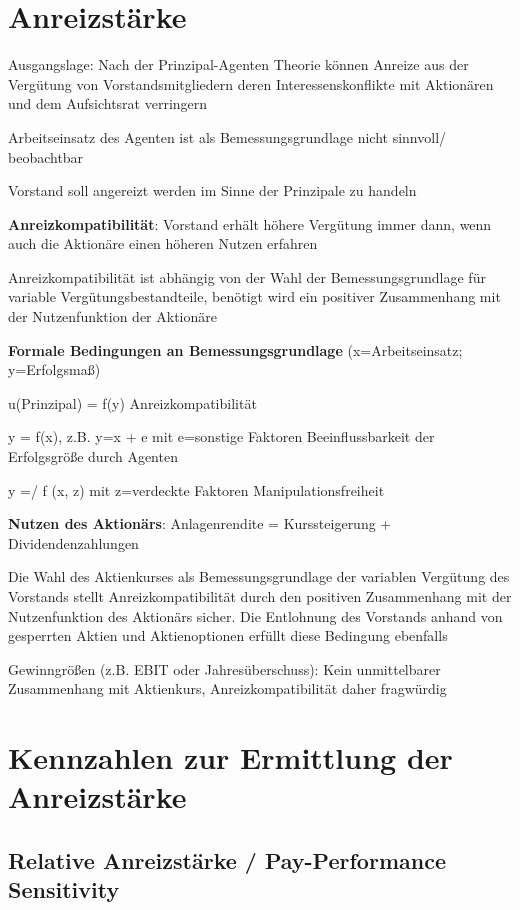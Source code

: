 \documentclass[
]{article}
\begin{document}
\hypertarget{anreizstuxe4rke}{%
\section{Anreizstärke}\label{anreizstuxe4rke}}

Ausgangslage: Nach der Prinzipal-Agenten Theorie können Anreize aus der
Vergütung von Vorstandsmitgliedern deren Interessenskonflikte mit
Aktionären und dem Aufsichtsrat verringern

Arbeitseinsatz des Agenten ist als Bemessungsgrundlage nicht sinnvoll/
beobachtbar

Vorstand soll angereizt werden im Sinne der Prinzipale zu handeln

\textbf{Anreizkompatibilität}: Vorstand erhält höhere Vergütung immer
dann, wenn auch die Aktionäre einen höheren Nutzen erfahren

Anreizkompatibilität ist abhängig von der Wahl der Bemessungsgrundlage
für variable Vergütungsbestandteile, benötigt wird ein positiver
Zusammenhang mit der Nutzenfunktion der Aktionäre

\textbf{Formale Bedingungen an Bemessungsgrundlage} (x=Arbeitseinsatz;
y=Erfolgsmaß)

u(Prinzipal) = f(y) Anreizkompatibilität

y = f(x), z.B. y=x + e mit e=sonstige Faktoren Beeinflussbarkeit der
Erfolgsgröße durch Agenten

y =/ f (x, z) mit z=verdeckte Faktoren Manipulationsfreiheit

\textbf{Nutzen des Aktionärs}: Anlagenrendite = Kurssteigerung +
Dividendenzahlungen

Die Wahl des Aktienkurses als Bemessungsgrundlage der variablen
Vergütung des Vorstands stellt Anreizkompatibilität durch den positiven
Zusammenhang mit der Nutzenfunktion des Aktionärs sicher. Die Entlohnung
des Vorstands anhand von gesperrten Aktien und Aktienoptionen erfüllt
diese Bedingung ebenfalls

Gewinngrößen (z.B. EBIT oder Jahresüberschuss): Kein unmittelbarer
Zusammenhang mit Aktienkurs, Anreizkompatibilität daher fragwürdig

\hypertarget{kennzahlen-zur-ermittlung-der-anreizstuxe4rke}{%
\section{Kennzahlen zur Ermittlung der
Anreizstärke}\label{kennzahlen-zur-ermittlung-der-anreizstuxe4rke}}

\hypertarget{relative-anreizstuxe4rke-pay-performance-sensitivity}{%
\subsection{Relative Anreizstärke / Pay-Performance
Sensitivity}\label{relative-anreizstuxe4rke-pay-performance-sensitivity}}
\end{document}
